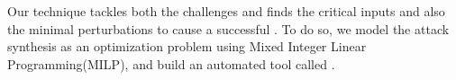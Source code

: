 

Our technique tackles both the challenges and finds the critical inputs and also the minimal perturbations to cause a successful \attack. To do so, we model the attack synthesis as an optimization problem using Mixed Integer Linear Programming(MILP), and build an automated tool called \tool. %

